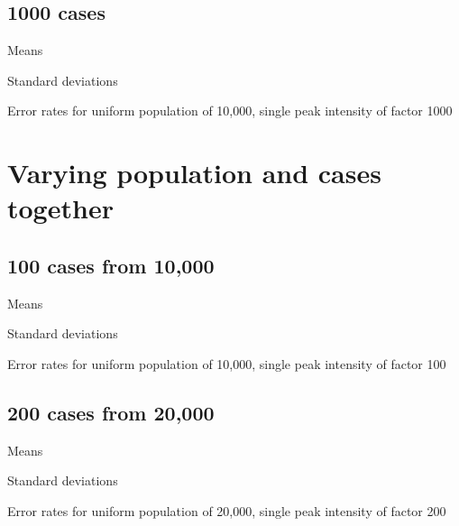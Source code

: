 \subsection{1000 cases}
\begin{table}[H]
\centering
\scriptsize

    \begin{subtable}{0.5\textwidth}
    
    \caption{Means} 
    \end{subtable}%
    \begin{subtable}{0.5\textwidth}
    
    \caption{Standard deviations} 
    \end{subtable}

\caption{Error rates for uniform population of 10,000, single peak intensity of factor 1000}
\label{tbl:mean_error_rates:unif_1000_1_1h}
\end{table}

\section{Varying population and cases together}

\subsection{100 cases from 10,000}
\begin{table}[H]
\centering
\scriptsize

    \begin{subtable}{0.5\textwidth}
    
    \caption{Means} 
    \end{subtable}%
    \begin{subtable}{0.5\textwidth}
    
    \caption{Standard deviations} 
    \end{subtable}

\caption{Error rates for uniform population of 10,000, single peak intensity of factor 100}
\label{tbl:mean_error_rates:unif_100_1_1h}
\end{table}

\subsection{200 cases from 20,000}
\begin{table}[H]
\centering
\scriptsize

    \begin{subtable}{0.5\textwidth}
    
    \caption{Means} 
    \end{subtable}%
    \begin{subtable}{0.5\textwidth}
    
    \caption{Standard deviations} 
    \end{subtable}

\caption{Error rates for uniform population of 20,000, single peak intensity of factor 200}
\label{tbl:mean_error_rates:unif20k_200_1_1h}
\end{table}

